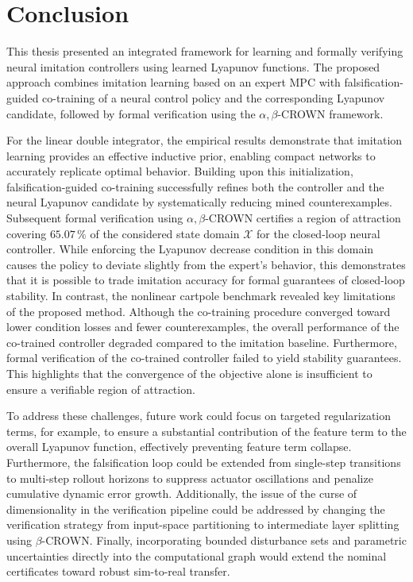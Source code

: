 \chapter{Conclusion}
\label{ch:conclusion}

This thesis presented an integrated framework for learning and formally verifying neural imitation controllers using 
learned Lyapunov functions. The proposed approach combines imitation learning based on an expert MPC with 
falsification-guided co-training of a neural control policy and the corresponding Lyapunov candidate, 
followed by formal verification using the $\alpha,\beta$-CROWN framework.

For the linear double integrator, the empirical results demonstrate that imitation learning provides an 
effective inductive prior, enabling compact networks to accurately replicate optimal behavior. 
Building upon this initialization, falsification-guided co-training successfully refines both the controller and 
the neural Lyapunov candidate by systematically reducing mined counterexamples. 
Subsequent formal verification using $\alpha,\beta$-CROWN certifies a region of attraction 
covering $65.07\,\%$ of the considered state domain $\mathcal{X}$ for the closed-loop neural controller. 
While enforcing the Lyapunov decrease condition in this domain causes the policy to deviate slightly
from the expert's behavior, this demonstrates that it is possible to trade imitation accuracy
for formal guarantees of closed-loop stability.
In contrast, the nonlinear cartpole benchmark revealed key limitations of the proposed method. 
Although the co-training procedure converged toward lower condition losses and fewer counterexamples, 
the overall performance of the co-trained controller degraded compared to the imitation baseline. 
Furthermore, formal verification of the co-trained controller failed to yield stability guarantees. 
This highlights that the convergence of the objective alone is insufficient to ensure a verifiable region of attraction.

To address these challenges, future work could focus on targeted regularization terms, for example, to ensure a substantial 
contribution of the feature term to the overall Lyapunov function, effectively preventing feature term collapse. 
Furthermore, the falsification loop could be extended from single-step transitions to multi-step rollout horizons 
to suppress actuator oscillations and penalize cumulative dynamic error growth. 
Additionally, the issue of the curse of dimensionality in the verification pipeline could be addressed by 
changing the verification strategy from input-space partitioning to intermediate layer splitting using $\beta$-CROWN. 
Finally, incorporating bounded disturbance sets and parametric uncertainties directly into the computational 
graph would extend the nominal certificates toward robust sim-to-real transfer.

